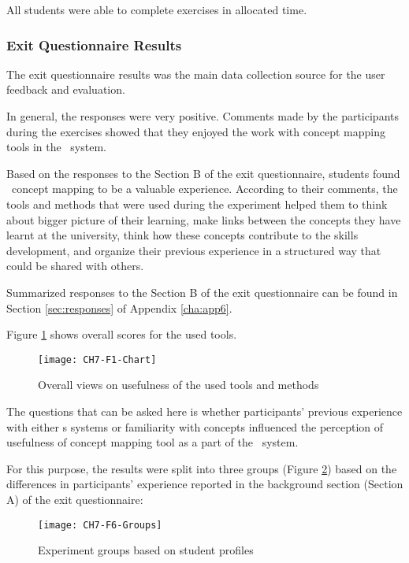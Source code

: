 All students were able to complete exercises in allocated time.
 
\subsubsection{Exit Questionnaire Results}
The exit questionnaire results was the main data collection source for the user
feedback and evaluation.

In general, the responses were very positive. Comments made by the participants
during the exercises showed that they enjoyed the work with concept mapping
tools in the \ep~system.

Based on the responses to the Section B of the exit questionnaire, students
found \ep~concept mapping to be a valuable experience. According to their
comments, the tools and methods that were used during the experiment helped
them to think about bigger picture of their learning, make links between the
concepts they have learnt at the university, think how these concepts contribute
to the skills development, and organize their previous experience in a 
structured way that could be shared with others.

Summarized responses to the Section B of the exit questionnaire can be found in
Section \ref{sec:responses} of Appendix \ref{cha:app6}.

Figure \ref{fig:overall} shows overall scores for the used tools.

\begin{figure}[htb]
\centering
\texttt{[image: CH7-F1-Chart]}
\caption{Overall views on usefulness of the used tools and methods}
\label{fig:overall}
\end{figure}

The questions that can be asked here is whether participants' previous
experience with either \ep s systems or familiarity with \LLLs concepts
influenced the perception of usefulness of concept mapping tool as a part of the
\ep~system.

For this purpose, the results were split into three groups (Figure
\ref{fig:groups}) based on the differences in participants' experience
reported in the background section (Section A) of the exit questionnaire:

\begin{figure}[htb]
\centering
\texttt{[image: CH7-F6-Groups]}
\caption{Experiment groups based on student profiles}
\label{fig:groups}
\end{figure}

